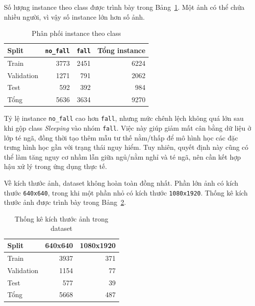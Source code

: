 \documentclass[12pt, a4paper]{article}
\begin{document}
Số lượng instance theo class được trình bày trong Bảng~\ref{tab:dataset_class_distribution}.
Một ảnh có thể chứa nhiều người, vì vậy số instance lớn hơn số ảnh.

\begin{table}[H]
  \centering
  \caption{Phân phối instance theo class}
  \label{tab:dataset_class_distribution}
  \begin{tabular}{@{}lrrr@{}}
    \toprule
    \textbf{Split} & \textbf{\texttt{no\_fall}} & \textbf{\texttt{fall}} & \textbf{Tổng instance} \\
    \midrule
    Train & 3773 & 2451 & 6224 \\
    Validation & 1271 & 791 & 2062 \\
    Test & 592 & 392 & 984 \\
    \midrule
    Tổng & 5636 & 3634 & 9270 \\
    \bottomrule
  \end{tabular}
\end{table}

Tỷ lệ instance \texttt{no\_fall} cao hơn \texttt{fall}, nhưng mức chênh lệch không quá lớn sau khi gộp class \textit{Sleeping} vào nhóm \texttt{fall}.
Việc này giúp giảm mất cân bằng dữ liệu ở lớp té ngã, đồng thời tạo thêm mẫu tư thế nằm/thấp để mô hình học các đặc trưng hình học gần với trạng thái nguy hiểm.
Tuy nhiên, quyết định này cũng có thể làm tăng nguy cơ nhầm lẫn giữa ngủ/nằm nghỉ và té ngã, nên cần kết hợp hậu xử lý trong ứng dụng thực tế.

Về kích thước ảnh, dataset không hoàn toàn đồng nhất.
Phần lớn ảnh có kích thước \texttt{640x640}, trong khi một phần nhỏ có kích thước \texttt{1080x1920}.
Thống kê kích thước ảnh được trình bày trong Bảng~\ref{tab:image_sizes}.

\begin{table}[H]
  \centering
  \caption{Thống kê kích thước ảnh trong dataset}
  \label{tab:image_sizes}
  \begin{tabular}{@{}lrr@{}}
    \toprule
    \textbf{Split} & \textbf{640x640} & \textbf{1080x1920} \\
    \midrule
    Train & 3937 & 371 \\
    Validation & 1154 & 77 \\
    Test & 577 & 39 \\
    \midrule
    Tổng & 5668 & 487 \\
    \bottomrule
  \end{tabular}
\end{table}
\end{document}
